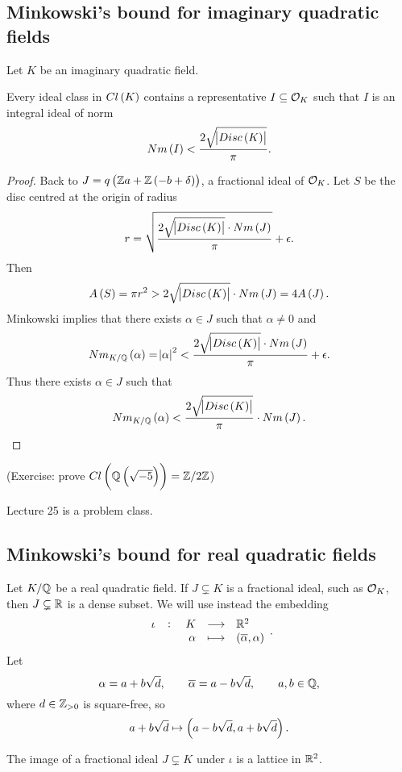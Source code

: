 \pagebreak

\subsection{Minkowski's bound for imaginary quadratic fields}

Let $ K $ be an imaginary quadratic field.

\begin{theorem}
Every ideal class in $ Cl\br{K} $ contains a representative $ I \subseteq \mathcal{O}_K $ such that $ I $ is an integral ideal of norm
$$ Nm\br{I} < \dfrac{2\sqrt{\abs{Disc\br{K}}}}{\pi}. $$
\end{theorem}

\begin{proof}
Back to $ J = q\br{\Z a + \Z\br{-b + \delta}} $, a fractional ideal of $ \mathcal{O}_K $. Let $ S $ be the disc centred at the origin of radius
$$ r = \sqrt{\dfrac{2\sqrt{\abs{Disc\br{K}}} \cdot Nm\br{J}}{\pi}} + \epsilon. $$
Then
$$ A\br{S} = \pi r^2 > 2\sqrt{\abs{Disc\br{K}}} \cdot Nm\br{J} = 4A\br{J}. $$
Minkowski implies that there exists $ \alpha \in J $ such that $ \alpha \ne 0 $ and
$$ Nm_{K / \Q}\br{\alpha} = \abs{\alpha}^2 < \dfrac{2\sqrt{\abs{Disc\br{K}}} \cdot Nm\br{J}}{\pi} + \epsilon. $$
Thus there exists $ \alpha \in J $ such that
$$ Nm_{K / \Q}\br{\alpha} < \dfrac{2\sqrt{\abs{Disc\br{K}}}}{\pi} \cdot Nm\br{J}. $$
\end{proof}

(Exercise: prove $ Cl\br{\Q\br{\sqrt{-5}}} = \Z / 2\Z $)


Lecture 25 is a problem class.

\subsection{Minkowski's bound for real quadratic fields}


Let $ K / \mathbb{Q} $ be a real quadratic field. If $ J \subsetneq K $ is a fractional ideal, such as $ \mathcal{O}_K $, then $ J \subsetneq \mathbb{R} $ is a dense subset. We will use instead the embedding
$$ \function[\iota]{K}{\R^2}{\alpha}{\br{\overline{\alpha}, \alpha}}. $$
Let
$$ \alpha = a + b\sqrt{d}, \qquad \overline{\alpha} = a - b\sqrt{d}, \qquad a, b \in \mathbb{Q}, $$
where $ d \in \mathbb{Z}_{> 0} $ is square-free, so
$$ a + b\sqrt{d} \mapsto \br{a - b\sqrt{d}, a + b\sqrt{d}}. $$

\begin{lemma}
The image of a fractional ideal $ J \subsetneq K $ under $ \iota $ is a lattice in $ \mathbb{R}^2 $.
\end{lemma}

